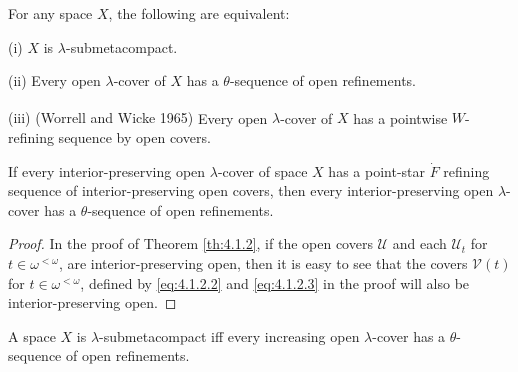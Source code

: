 \documentclass[main.tex]{subfiles}
\begin{document}
{\corollary{} \label{cor:4.1.3} 
For any space $X$, the following are equivalent:

\textup{(i)} $X$ is $\lambda$-submetacompact.

\textup{(ii)}  Every open $\lambda$-cover of $X$ has a $\theta$-sequence of  open refinements.

\textup{(iii) (\hstretch{1.8}{[}Worrell and Wicke 1965\hstretch{1.8}{]}\textsuperscript{\cite{WorrellWicke}})} Every open $\lambda$-cover of $X$ has 
a pointwise $W$-refining sequence by open covers. \hfill\qedsymbol
}

{\lemma{} \label{lem:4.1.4}
If every interior-preserving open $\lambda$-cover of space $X$ has a point-star $\dot{F}$  
refining sequence of interior-preserving open covers, 
then every interior-preserving open $\lambda$-cover has a $\theta$-sequence of open refinements.
}


\begin{proof}
In the proof of Theorem \ref{th:4.1.2}, if the open covers $\mathscr{U}$ and each $\mathscr{U}_{t}$
for  $t \in \omega^{<\omega}$, are interior-preserving open, then it is easy to see that the covers 
$\mathscr{V}(t)$ for $t \in \omega^{<\omega}$, defined by \eqref{eq:4.1.2.2} and \eqref{eq:4.1.2.3} in
the proof will also be interior-preserving open.
\end{proof}

{\theorem{} \label{th:4.1.5}
A space $X$ is $\lambda$-submetacompact iff every increasing open $\lambda$-cover has a 
$\theta$-sequence of open refinements.
}
\end{document}
